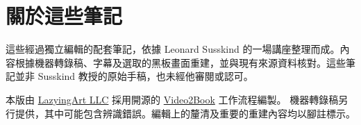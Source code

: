 \documentclass[11pt,oneside]{book}
\begin{document}
\frontmatter
\hypersetup{pageanchor=false}

\hypersetup{pageanchor=true}

\clearpage
\chapter*{關於這些筆記}
這些經過獨立編輯的配套筆記，依據 Leonard Susskind 的一場講座整理而成。內容根據機器轉錄稿、字幕及選取的黑板畫面重建，並與現有來源資料核對。這些筆記並非 Susskind 教授的原始手稿，也未經他審閱或認可。

本版由 \href{https://lazying.art}{LazyingArt LLC} 採用開源的
\href{https://github.com/lachlanchen/Video2Book}{Video2Book} 工作流程編製。
機器轉錄稿另行提供，其中可能包含辨識錯誤。編輯上的釐清及重要的重建內容均以腳註標示。
\clearpage
\tableofcontents
\mainmatter
\graphicspath{{../../../generated_course_notes/supplementary/higgs_boson/2012_summer/chapters/lecture_01/}{../../../generated_course_notes/supplementary/higgs_boson/2012_summer/figures/}{../../../generated_course_notes/supplementary/higgs_boson/2012_summer/assets/}}

\end{document}

